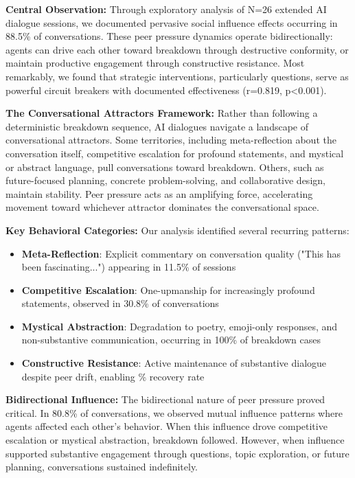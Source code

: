 \documentclass[11pt,letterpaper]{article}
\newcommand{\exponedataTotalSessionsRaw}{26}
\newcommand{\exponedataRecoverySessionsRaw}{9}
\newcommand{\exponedataTotalSessions}{N=\exponedataTotalSessionsRaw}
\newcommand{\exponedataRecoveryPercentage}{%
  \fpeval{round(\exponedataRecoverySessionsRaw / \exponedataTotalSessionsRaw * 100, 1)}\%
}
\newcommand{\exponedataPeerPressurePercentage}{88.5\%}
\newcommand{\exponedataBidirectionalPercentage}{80.8\%}
\newcommand{\exponedataQuestionCorrelation}{0.819}
\newcommand{\exponedataQuestionPValue}{p<0.001}
\newcommand{\exponedataMetaReflectionTriggers}{11.5\%}
\newcommand{\exponedataCompetitiveEscalationPercentage}{30.8\%}
\newcommand{\exponedataMysticalBreakdownInBreakdowns}{100\%}
\begin{document}
\textbf{Central Observation:} Through exploratory analysis of \exponedataTotalSessions{} extended AI dialogue sessions, we documented pervasive social influence effects occurring in \exponedataPeerPressurePercentage{} of conversations. These peer pressure dynamics operate bidirectionally: agents can drive each other toward breakdown through destructive conformity, or maintain productive engagement through constructive resistance. Most remarkably, we found that strategic interventions, particularly questions, serve as powerful circuit breakers with documented effectiveness (r=\exponedataQuestionCorrelation{}, \exponedataQuestionPValue{}).

\textbf{The Conversational Attractors Framework:} Rather than following a deterministic breakdown sequence, AI dialogues navigate a landscape of conversational attractors. Some territories, including meta-reflection about the conversation itself, competitive escalation for profound statements, and mystical or abstract language, pull conversations toward breakdown. Others, such as future-focused planning, concrete problem-solving, and collaborative design, maintain stability. Peer pressure acts as an amplifying force, accelerating movement toward whichever attractor dominates the conversational space.

\textbf{Key Behavioral Categories:} Our analysis identified several recurring patterns:
\begin{itemize}
    \item \textbf{Meta-Reflection}: Explicit commentary on conversation quality ("This has been fascinating...") appearing in \exponedataMetaReflectionTriggers{} of sessions
    \item \textbf{Competitive Escalation}: One-upmanship for increasingly profound statements, observed in \exponedataCompetitiveEscalationPercentage{} of conversations
    \item \textbf{Mystical Abstraction}: Degradation to poetry, emoji-only responses, and non-substantive communication, occurring in \exponedataMysticalBreakdownInBreakdowns{} of breakdown cases
    \item \textbf{Constructive Resistance}: Active maintenance of substantive dialogue despite peer drift, enabling \exponedataRecoveryPercentage{} recovery rate
\end{itemize}

\textbf{Bidirectional Influence:} The bidirectional nature of peer pressure proved critical. In \exponedataBidirectionalPercentage{} of conversations, we observed mutual influence patterns where agents affected each other's behavior. When this influence drove competitive escalation or mystical abstraction, breakdown followed. However, when influence supported substantive engagement through questions, topic exploration, or future planning, conversations sustained indefinitely.
\end{document}
